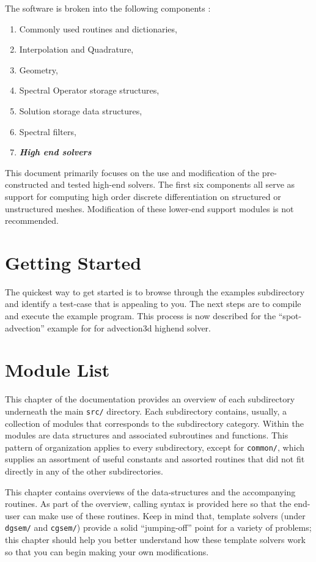 \documentclass[12pt]{softwaremanual}
\begin{document}
The software is broken into the following components :
\begin{enumerate}
\item Commonly used routines and dictionaries,
\item Interpolation and Quadrature,
\item Geometry,
\item Spectral Operator storage structures,
\item Solution storage data structures,
\item Spectral filters,
\item \textbf{\textit{High end solvers}}
\end{enumerate}

This document primarily focuses on the use and modification of the pre-constructed and tested high-end solvers. The first six components all serve as support for computing high order discrete differentiation on structured or unstructured meshes. Modification of these lower-end support modules is not recommended. 

\chapter{Getting Started}
The quickest way to get started is to browse through the examples subdirectory and identify a test-case that is appealing to you. The next steps are to compile and execute the example program. This process is now described for the ``spot-advection'' example for for advection3d highend solver.


\chapter{Module List}
This chapter of the documentation provides an overview of each subdirectory underneath the main \texttt{src/} directory. Each subdirectory contains, usually, a collection of modules that corresponds to the subdirectory category. Within the modules are data structures and associated subroutines and functions. This pattern of organization applies to every subdirectory, except for \texttt{common/}, which supplies an assortment of useful constants and assorted routines that did not fit directly in any of the other subdirectories.

 This chapter contains overviews of the data-structures and the accompanying routines. As part of the overview, calling syntax is provided here so that the end-user can make use of these routines. Keep in mind that, template solvers (under \texttt{dgsem/} and \texttt{cgsem/}) provide a solid ``jumping-off'' point for a variety of problems; this chapter should help you better understand how these template solvers work so that you can begin making your own modifications.
 
\end{document}
